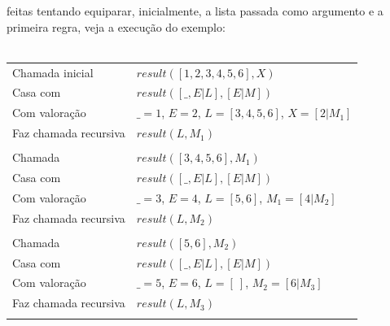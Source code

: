 \documentclass[12pt]{article}
\begin{document}
\begin{itemize}
\begin{itemize}
					feitas tentando equiparar, inicialmente, a lista passada como argumento e a 
					primeira regra, veja a execução do exemplo:\\ \\
					\begin{tabular}{ll}
						Chamada inicial & $result([1, 2, 3, 4, 5, 6], X)$\\
						Casa com & $result([\_, E | L], [E | M])$\\
						Com valoração & $\_ = 1$, $E = 2$, $L = [3, 4, 5, 6]$, $X = [2|M_1]$\\
						Faz chamada recursiva & $result(L, M_1)$\\ \\
						
						Chamada & $result([3, 4, 5, 6], M_1)$\\
						Casa com & $result([\_, E | L], [E | M])$\\
						Com valoração & $\_ = 3$, $E = 4$, $L = [5, 6]$, $M_1 = [4|M_2]$\\
						Faz chamada recursiva & $result(L, M_2)$\\ \\
						
						Chamada & $result([5, 6], M_2)$\\
						Casa com & $result([\_, E | L], [E | M])$\\
						Com valoração & $\_ = 5$, $E = 6$, $L = [ \ ]$, $M_2 = [6|M_3]$\\
						Faz chamada recursiva & $result(L, M_3)$\\ \\
						

\end{tabular}
\end{itemize}
\end{itemize}
\end{document}
